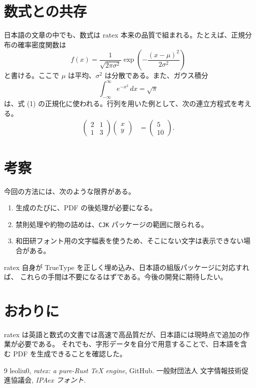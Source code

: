\documentclass[11pt]{article}
\newcommand{\goth}[1]{#1}
\begin{document}
\section{\goth{数式との共存}}
日本語の文章の中でも、数式は ratex 本来の品質で組まれる。たとえば、正規分布の確率密度関数は
\begin{equation}
  f(x) = \frac{1}{\sqrt{2\pi\sigma^2}} \exp\!\left( -\frac{(x-\mu)^2}{2\sigma^2} \right)
\end{equation}
と書ける。ここで $\mu$ は平均、$\sigma^2$ は分散である。また、ガウス積分
\begin{equation}
  \int_{-\infty}^{\infty} e^{-x^2}\,dx = \sqrt{\pi}
\end{equation}
は、式 (1) の正規化に使われる。行列を用いた例として、次の連立方程式を考える。
\begin{align}
  \begin{pmatrix} 2 & 1 \\ 1 & 3 \end{pmatrix}
  \begin{pmatrix} x \\ y \end{pmatrix}
  &=
  \begin{pmatrix} 5 \\ 10 \end{pmatrix}.
\end{align}

\section{\goth{考察}}
今回の方法には、次のような限界がある。
\begin{enumerate}
  \item 生成のたびに、PDF の後処理が必要になる。
  \item 禁則処理や約物の詰めは、\texttt{CJK} パッケージの範囲に限られる。
  \item 和田研フォント用の文字幅表を使うため、そこにない文字は表示できない場合がある。
\end{enumerate}
ratex 自身が TrueType を正しく埋め込み、日本語の組版パッケージに対応すれば、
これらの手間は不要になるはずである。今後の開発に期待したい。

\section{\goth{おわりに}}
ratex は英語と数式の文書では高速で高品質だが、日本語には現時点で追加の作業が必要である。
それでも、字形データを自分で用意することで、日本語を含む PDF を生成できることを確認した。

\begin{thebibliography}{9}
 leoliu0, \textit{ratex: a pure-Rust TeX engine}, GitHub.
 一般財団法人 文字情報技術促進協議会, \textit{IPAex フォント}.
\end{thebibliography}
\end{document}
